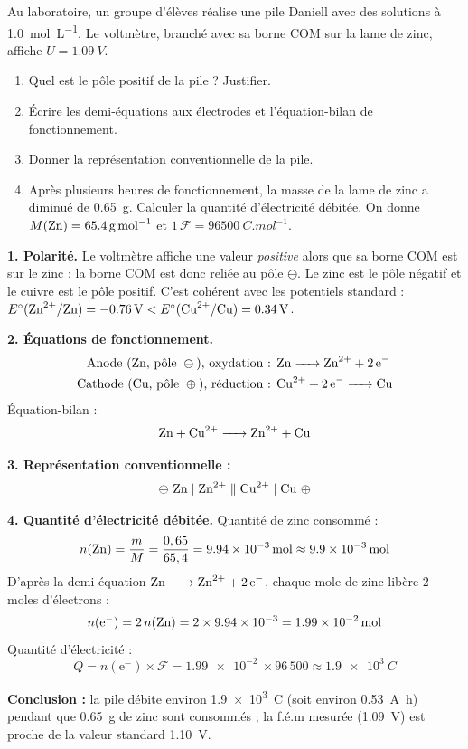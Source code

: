 \documentclass[11pt]{article}
\newcommand{\cle}[1]{{\popxbold\color{popdark}#1}}
\begin{document}
\begin{exoresolu}
Au laboratoire, un groupe d'élèves réalise une pile Daniell avec des solutions à \SI{1,0}{mol.L^{-1}}. Le voltmètre, branché avec sa borne COM sur la lame de zinc, affiche $U = \SI{+1,09}{V}$.
\begin{enumerate}
\item Quel est le pôle positif de la pile ? Justifier.
\item Écrire les demi-équations aux électrodes et l'équation-bilan de fonctionnement.
\item Donner la représentation conventionnelle de la pile.
\item Après plusieurs heures de fonctionnement, la masse de la lame de zinc a diminué de \SI{0,65}{g}. Calculer la quantité d'électricité débitée. On donne $M(\ce{Zn}) = \SI{65,4}{g.mol^{-1}}$ et $1\,\mathcal{F} = \SI{96500}{C.mol^{-1}}$.
\end{enumerate}
\tcblower
\textbf{1. Polarité.} Le voltmètre affiche une valeur \emph{positive} alors que sa borne COM est sur le zinc : la borne COM est donc reliée au pôle $\ominus$. Le \cle{zinc est le pôle négatif} et le \cle{cuivre est le pôle positif}. C'est cohérent avec les potentiels standard : $E^{\circ}(\ce{Zn^2+}/\ce{Zn}) = \SI{-0,76}{V} < E^{\circ}(\ce{Cu^2+}/\ce{Cu}) = \SI{+0,34}{V}$.

\textbf{2. Équations de fonctionnement.}
\begin{align*}
\text{Anode (Zn, pôle } \ominus \text{), oxydation : } & \ce{Zn -> Zn^2+ + 2e-}\\
\text{Cathode (Cu, pôle } \oplus \text{), réduction : } & \ce{Cu^2+ + 2e- -> Cu}
\end{align*}
Équation-bilan :
\[ \ce{Zn + Cu^2+ -> Zn^2+ + Cu} \]

\textbf{3. Représentation conventionnelle :}
\[ \ominus\ \ce{Zn} \mid \ce{Zn^2+} \parallel \ce{Cu^2+} \mid \ce{Cu}\ \oplus \]

\textbf{4. Quantité d'électricité débitée.}
Quantité de zinc consommé :
\[ n(\ce{Zn}) = \frac{m}{M} = \frac{0,65}{65,4} = \SI{9,94e-3}{mol} \approx \SI{9,9e-3}{mol} \]
D'après la demi-équation $\ce{Zn -> Zn^2+ + 2e-}$, chaque mole de zinc libère 2 moles d'électrons :
\[ n(\text{e}^-) = 2\,n(\ce{Zn}) = 2 \times \SI{9,94e-3}{} = \SI{1,99e-2}{mol} \]
Quantité d'électricité :
\[ Q = n(\text{e}^-) \times \mathcal{F} = \SI{1,99e-2}{} \times 96\,500 \approx \SI{1,9e3}{C} \]

\textbf{Conclusion :} la pile débite environ \SI{1,9e3}{C} (soit environ \SI{0,53}{A.h}) pendant que \SI{0,65}{g} de zinc sont consommés ; la f.é.m mesurée (\SI{1,09}{V}) est proche de la valeur standard \SI{1,10}{V}.
\end{exoresolu}
\end{document}

